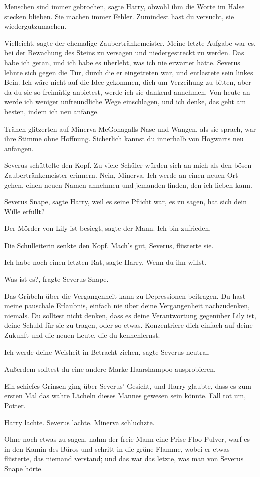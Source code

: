 \glqq{}Menschen sind immer gebrochen\grqq{}, sagte Harry, obwohl ihm die Worte im
Halse stecken blieben. \glqq{}Sie machen immer Fehler. Zumindest hast du
versucht, sie wiedergutzumachen.\grqq{}

\glqq{}Vielleicht\grqq{}, sagte der ehemalige Zaubertränkemeister. \glqq{}Meine
letzte Aufgabe war es, bei der Bewachung des Steins zu versagen und
niedergestreckt zu werden. Das habe ich getan, und ich habe es überlebt, was ich
nie erwartet hätte.\grqq{} Severus lehnte sich gegen die Tür, durch die er eingetreten
war, und entlastete sein linkes Bein. \glqq{}Ich wäre nicht auf die Idee
gekommen, dich um Verzeihung zu bitten, aber da du sie so freimütig anbietest,
werde ich sie dankend annehmen. Von heute an werde ich weniger unfreundliche
Wege einschlagen, und ich denke, das geht am besten, indem ich neu anfange.\grqq{}

Tränen glitzerten auf Minerva McGonagalls Nase und Wangen, als sie sprach, war
ihre Stimme ohne Hoffnung. \glqq{}Sicherlich kannst du innerhalb von Hogwarts neu
anfangen.\grqq{}

Severus schüttelte den Kopf. \glqq{}Zu viele Schüler würden sich an mich als den
bösen Zaubertränkemeister erinnern. Nein, Minerva. Ich werde an einen neuen Ort
gehen, einen neuen Namen annehmen und jemanden finden, den ich lieben kann.\grqq{}

\glqq{}Severus Snape\grqq{}, sagte Harry, weil es seine Pflicht war, es zu sagen,
\glqq{}hat sich dein Wille erfüllt?\grqq{}

\glqq{}Der Mörder von Lily ist besiegt\grqq{}, sagte der Mann. \glqq{}Ich bin
zufrieden.\grqq{}

Die Schulleiterin senkte den Kopf. \glqq{}Mach's gut, Severus\grqq{}, flüsterte
sie.

\glqq{}Ich habe noch einen letzten Rat\grqq{}, sagte Harry. \glqq{}Wenn du ihn
willst.\grqq{}

\glqq{}Was ist es?\grqq{}, fragte Severus Snape.

\glqq{}Das Grübeln über die Vergangenheit kann zu Depressionen beitragen. Du hast
meine pauschale Erlaubnis, einfach nie über deine Vergangenheit nachzudenken,
niemals. Du solltest nicht denken, dass es deine Verantwortung gegenüber Lily
ist, deine Schuld für sie zu tragen, oder so etwas. Konzentriere dich einfach
auf deine Zukunft und die neuen Leute, die du kennenlernst.\grqq{}

\glqq{}Ich werde deine Weisheit in Betracht ziehen\grqq{}, sagte Severus neutral.

\glqq{}Außerdem solltest du eine andere Marke Haarshampoo ausprobieren.\grqq{}

Ein schiefes Grinsen ging über Severus' Gesicht, und Harry glaubte, dass es zum
ersten Mal das wahre Lächeln dieses Mannes gewesen sein könnte. \glqq{}Fall tot
um, Potter.\grqq{}

Harry lachte. Severus lachte. Minerva schluchzte.

Ohne noch etwas zu sagen, nahm der freie Mann eine Prise Floo-Pulver, warf es in
den Kamin des Büros und schritt in die grüne Flamme, wobei er etwas flüsterte,
das niemand verstand; und das war das letzte, was man von Severus Snape hörte.

